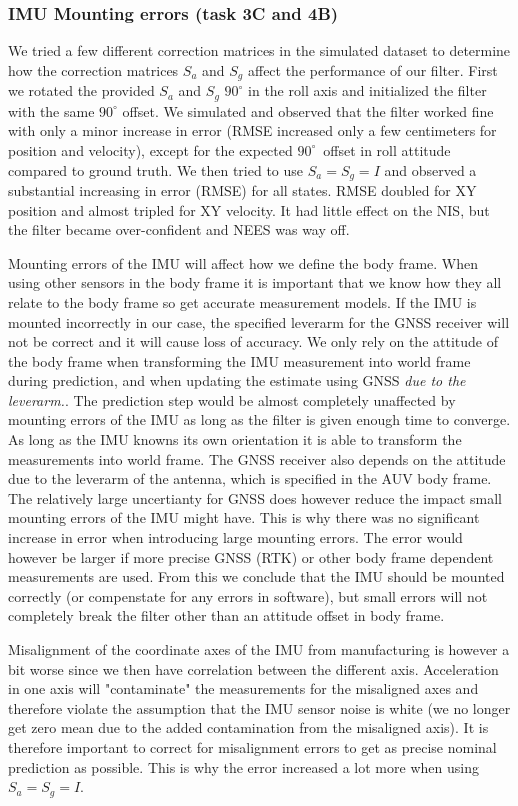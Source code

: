 \subsubsection{IMU Mounting errors (task 3C and 4B)}
We tried a few different correction matrices  in the simulated dataset to determine how the correction matrices $S_a$ and $S_g$ affect the performance of our filter. First we rotated the provided $S_a$ and $S_g$ $90^\circ$ in the roll axis and initialized the filter with the same $90^\circ$ offset. We simulated and observed that the filter worked fine with only a minor increase in error (RMSE increased only a few centimeters for position and velocity), except for the expected $90^\circ$ offset in roll attitude compared to ground truth. We then tried to use $S_a = S_g = I$ and observed a substantial increasing in error (RMSE) for all states. RMSE doubled for XY position and almost tripled for XY velocity. It had little effect on the NIS, but the filter became over-confident and NEES was way off.

Mounting errors of the IMU will affect how we define the body frame. When using other sensors in the body frame it is important that we know how they all relate to the body frame so get accurate measurement models. If the IMU is mounted incorrectly in our case, the specified leverarm for the GNSS receiver will not be correct and it will cause loss of accuracy. We only rely on the attitude of the body frame when transforming the IMU measurement into world frame during prediction, and when updating the estimate using GNSS \textit{due to the leverarm.}. The prediction step would be almost completely unaffected by mounting errors of the IMU as long as the filter is given enough time to converge. As long as the IMU knowns its own orientation it is able to transform the measurements into world frame. The GNSS receiver also depends on the attitude due to the leverarm of the antenna, which is specified in the AUV body frame. The relatively large uncertianty for GNSS does however reduce the impact small mounting errors of the IMU might have. This is why there was no significant increase in error when introducing large mounting errors. The error would however be larger if more precise GNSS (RTK) or other body frame dependent measurements are used. From this we conclude that the IMU should be mounted correctly (or compenstate for any errors in software), but small errors will not completely break the filter other than an attitude offset in body frame. 

Misalignment of the coordinate axes of the IMU from manufacturing is however a bit worse since we then have correlation between the different axis. Acceleration in one axis will "contaminate" the measurements for the misaligned axes and therefore violate the assumption that the IMU sensor noise is white (we no longer get zero mean due to the added contamination from the misaligned axis). It is therefore important to correct for misalignment errors to get as precise nominal prediction as possible. This is why the error increased a lot more when using $S_a = S_g = I$.

